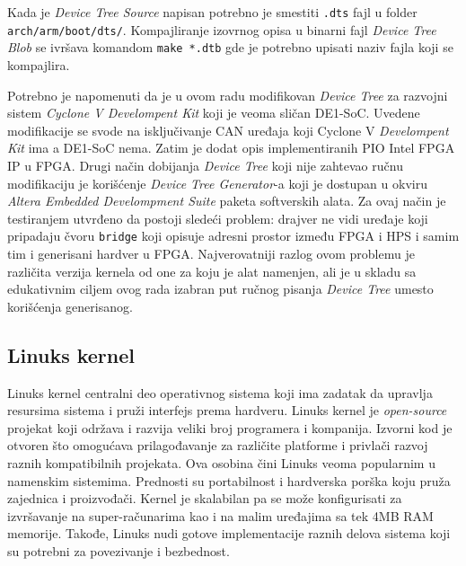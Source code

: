 Kada je \textit{Device Tree Source} napisan potrebno je smestiti \texttt{.dts} fajl u folder \texttt{arch/arm/boot/dts/}. Kompajliranje izovrnog opisa u binarni fajl \textit{Device Tree Blob} se ivršava komandom \texttt{make *.dtb} gde je potrebno upisati naziv fajla koji se kompajlira.

Potrebno je napomenuti da je u ovom radu modifikovan \textit{Device Tree} za razvojni sistem \textit{Cyclone V Develompent Kit} koji je veoma sličan DE1-SoC. Uvedene modifikacije se svode na isključivanje CAN uređaja koji Cyclone V \textit{Develompent Kit} ima a DE1-SoC nema. Zatim je dodat opis implementiranih PIO Intel FPGA IP u FPGA. Drugi način dobijanja \textit{Device Tree} koji nije zahtevao ručnu modifikaciju je korišćenje \textit{Device Tree Generator}-a koji je dostupan u okviru \textit{Altera Embedded Develompment Suite} paketa softverskih alata. Za ovaj način je testiranjem utvrđeno da postoji sledeći problem: drajver ne vidi uređaje koji pripadaju čvoru \texttt{bridge} koji opisuje adresni prostor između FPGA i HPS i samim tim i generisani hardver u FPGA. Najverovatniji razlog ovom problemu je različita verzija kernela od one za koju je alat namenjen, ali je u skladu sa edukativnim ciljem ovog rada izabran put ručnog pisanja \textit{Device Tree} umesto korišćenja generisanog.

\subsection{Linuks kernel}
Linuks kernel centralni deo operativnog sistema koji ima zadatak da upravlja resursima sistema i pruži interfejs prema hardveru. Linuks kernel je \textit{open-source} projekat koji održava i razvija veliki broj programera i kompanija. Izvorni kod je otvoren što omogućava prilagođavanje za različite platforme i privlači razvoj raznih kompatibilnih projekata. Ova osobina čini Linuks veoma popularnim u namenskim sistemima. Prednosti su portabilnost i hardverska porška koju pruža zajednica i proizvođači. Kernel je skalabilan pa se može konfigurisati za izvršavanje na super-računarima kao i na malim uređajima sa tek 4MB RAM memorije. Takođe, Linuks nudi gotove implementacije raznih delova sistema koji su potrebni za povezivanje i bezbednost.

